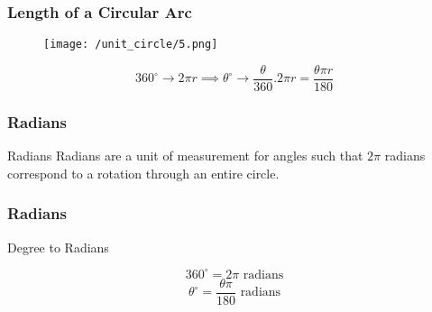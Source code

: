     \begin{frame}
        \frametitle{Length of a Circular Arc}
        \begin{figure}
            \centering
            \texttt{[image: /unit\_circle/5.png]}
        \end{figure}
        \[ 360^{\circ}   \rightarrow  2 \pi r \implies \theta^{\circ}  \rightarrow \frac{\theta}{360}.2\pi r  = \frac{\theta \pi r}{180}\] 
    \end{frame}
    
    \begin{frame}
        \frametitle{Radians}
       \begin{block}{Radians}
        Radians are a unit of measurement for angles such that $2\pi$ radians correspond
        to a rotation through an entire circle.
       \end{block}
    \end{frame}
    

    \begin{frame}
        \frametitle{Radians}
       \begin{block}{Degree to Radians}
    
        \[ 360^{\circ} = 2 \pi \text{ radians} \]
        \[ \theta ^{\circ}  = \frac{\theta \pi}{180} \text{ radians} \]
        
       \end{block}
    \end{frame}
    
    
    
